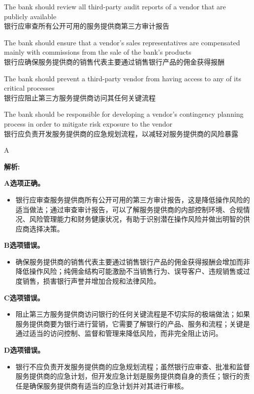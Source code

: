 \documentclass{article}
\newenvironment{explanation}
{\textbf{解析:}\par}
{\par}
\begin{document}
\begin{choices}
    \item The bank should review all third-party audit reports of a vendor that are publicly available\\
    银行应审查所有公开可用的服务提供商第三方审计报告
    \item The bank should ensure that a vendor's sales representatives are compensated mainly with commissions from the sale of the bank's products\\
    银行应确保服务提供商的销售代表主要通过销售银行产品的佣金获得报酬
    \item The bank should prevent a third-party vendor from having access to any of its critical processes\\
    银行应阻止第三方服务提供商访问其任何关键流程
    \item The bank should be responsible for developing a vendor's contingency planning process in order to mitigate risk exposure to the vendor\\
    银行应负责开发服务提供商的应急规划流程，以减轻对服务提供商的风险暴露
\end{choices}

\begin{correctanswer}
    A
\end{correctanswer}

\begin{explanation}
    \textbf{A选项正确。}
    \begin{itemize}
        \item 银行应审查服务提供商所有公开可用的第三方审计报告，这是降低操作风险的适当做法；通过审查审计报告，可以了解服务提供商的内部控制环境、合规情况、风险管理能力和财务健康状况，有助于识别潜在操作风险并做出明智的供应商选择决策。
    \end{itemize}

    \textbf{B选项错误。}
    \begin{itemize}
        \item 确保服务提供商的销售代表主要通过销售银行产品的佣金获得报酬会增加而非降低操作风险；纯佣金结构可能激励不当销售行为、误导客户、违规销售或过度销售，损害银行声誉并增加合规和法律风险。
    \end{itemize}

    \textbf{C选项错误。}
    \begin{itemize}
        \item 阻止第三方服务提供商访问银行的任何关键流程是不切实际的极端做法；如果服务提供商要为银行进行营销，它需要了解银行的产品、服务和流程；关键是通过适当的访问控制、监督和管理来降低风险，而非完全阻止访问。
    \end{itemize}

    \textbf{D选项错误。}
    \begin{itemize}
        \item 银行不应负责开发服务提供商的应急规划流程；虽然银行应审查、批准和监督服务提供商的应急计划，但开发应急计划是服务提供商自身的责任；银行的责任是确保服务提供商有适当的应急计划并对其进行审核。
    \end{itemize}
\end{explanation}
\end{document}
